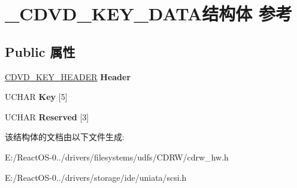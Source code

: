 \hypertarget{struct___c_d_v_d___k_e_y___d_a_t_a}{}\section{\+\_\+\+C\+D\+V\+D\+\_\+\+K\+E\+Y\+\_\+\+D\+A\+T\+A结构体 参考}
\label{struct___c_d_v_d___k_e_y___d_a_t_a}
\subsection*{Public 属性}
\begin{DoxyCompactItemize}
\item 
\mbox{\label{struct___c_d_v_d___k_e_y___d_a_t_a_ac7a052d12c3f8510e5ed3bebe2969979}} 
\hyperlink{struct___c_d_v_d___k_e_y___h_e_a_d_e_r}{C\+D\+V\+D\+\_\+\+K\+E\+Y\+\_\+\+H\+E\+A\+D\+ER} {\bfseries Header}
\item 
\mbox{\label{struct___c_d_v_d___k_e_y___d_a_t_a_a710b641c23440bdb0031224196c6fa4e}} 
U\+C\+H\+AR {\bfseries Key} \mbox{[}5\mbox{]}
\item 
\mbox{\label{struct___c_d_v_d___k_e_y___d_a_t_a_ac4b135e86948ee6f0b51bc746cbf56b9}} 
U\+C\+H\+AR {\bfseries Reserved} \mbox{[}3\mbox{]}
\end{DoxyCompactItemize}


该结构体的文档由以下文件生成\+:\begin{DoxyCompactItemize}
\item 
E\+:/\+React\+O\+S-\/0../drivers/filesystems/udfs/\+C\+D\+R\+W/cdrw\+\_\+hw.\+h\item 
E\+:/\+React\+O\+S-\/0../drivers/storage/ide/uniata/scsi.\+h\end{DoxyCompactItemize}
